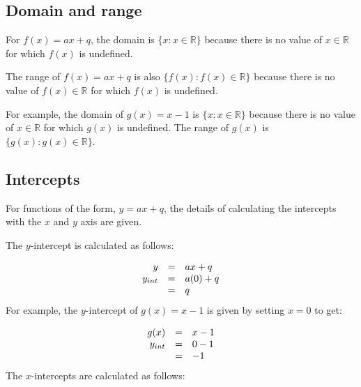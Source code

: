 \subsection*{Domain and range}
\nopagebreak
For $f(x)=ax+q$, the domain is $\{x:x\in \mathbb{R}\}$ because there is no value of $x\in \mathbb{R}$ for which $f(x)$ is undefined.\par 
The range of $f(x)=ax+q$ is also $\{f(x):f(x)\in \mathbb{R}\}$ because there is no value of $f(x)\in \mathbb{R}$ for which $f(x)$ is undefined.\par 
For example, the domain of $g(x)=x-1$ is $\{x:x\in \mathbb{R}\}$ because there is no value of $x\in \mathbb{R}$ for which $g(x)$ is undefined. The range of $g(x)$ is $\{g(x):g(x)\in \mathbb{R}\}$.\par 

\subsection*{Intercepts}

For functions of the form, $y=ax+q$, the details of calculating the intercepts with the $x$ and $y$ axis are given.\par 
The $y$-intercept is calculated as follows:\par 

\begin{equation*}
\begin{array}{ccc}\hfill y& =& ax+q\hfill \\
\hfill {y}_{int}& =& a(0)+q\hfill \\
& =& q\hfill 
\end{array}
\end{equation*}
For example, the $y$-intercept of $g(x)=x-1$ is given by setting $x=0$ to get:\par 

\begin{equation*}
\begin{array}{ccc}\hfill g(x)& =& x-1\hfill \\
\hfill {y}_{int}& =& 0-1\hfill \\
& =& -1\hfill 
\end{array}
\end{equation*}
The $x$-intercepts are calculated as follows:\par 


